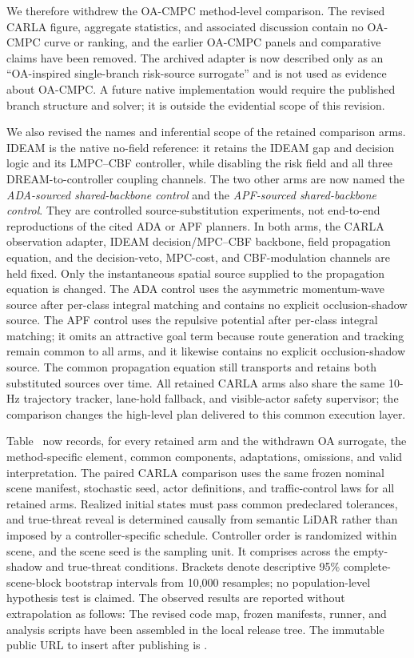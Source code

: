 We therefore withdrew the OA-CMPC method-level comparison.  The revised
CARLA figure, aggregate statistics, and associated discussion contain no
OA-CMPC curve or ranking, and the earlier OA-CMPC panels and comparative
claims have been removed.  The archived adapter is now described only as an
``OA-inspired single-branch risk-source surrogate'' and is not used as
evidence about OA-CMPC.  A future native implementation would require the
published branch structure and solver; it is outside the evidential scope of
this revision.

We also revised the names and inferential scope of the retained comparison
arms.  IDEAM is the native no-field reference: it retains the IDEAM gap and
decision logic and its LMPC--CBF controller, while disabling the risk field
and all three DREAM-to-controller coupling channels.  The two other arms are
now named the \emph{ADA-sourced shared-backbone control} and the
\emph{APF-sourced shared-backbone control}.  They are controlled
source-substitution experiments, not end-to-end reproductions of the cited
ADA or APF planners.  In both arms, the CARLA observation adapter, IDEAM
decision/MPC--CBF backbone, field propagation equation, and the decision-veto,
MPC-cost, and CBF-modulation channels are held fixed.  Only the instantaneous
spatial source supplied to the propagation equation is changed.  The ADA
control uses the asymmetric momentum-wave source after per-class integral
matching and contains no explicit occlusion-shadow source.  The APF control
uses the repulsive potential after per-class integral matching; it omits an
attractive goal term because route generation and tracking remain common to
all arms, and it likewise contains no explicit occlusion-shadow source.  The
common propagation equation still transports and retains both substituted
sources over time.  All retained CARLA arms also share the same 10-Hz
trajectory tracker, lane-hold fallback, and visible-actor safety supervisor;
the comparison changes the high-level plan delivered to this common execution
layer.

Table~\BaselineFidelityTableNumber{} now records, for every retained arm and
the withdrawn OA surrogate, the method-specific element, common components,
adaptations, omissions, and valid interpretation.  The paired CARLA comparison
uses the same frozen nominal
scene manifest, stochastic seed, actor definitions, and traffic-control laws
for all retained arms.  Realized initial states must pass common predeclared
tolerances, and true-threat reveal is determined causally from semantic LiDAR
rather than imposed by a controller-specific schedule.  Controller order is
randomized within scene, and the scene seed is the sampling unit.  It comprises
\CarlaSceneCount{} across the empty-shadow and true-threat conditions.
Brackets denote descriptive 95\% complete-scene-block bootstrap intervals from
10,000 resamples; no population-level hypothesis test is claimed.  The
observed results are reported without extrapolation as follows:
\CarlaEmptyShadowFinding{}
\CarlaThreatFinding{} The revised code map, frozen manifests, runner, and
analysis scripts have been assembled in the local release tree.  The
immutable public URL to insert after publishing is \BaselineCodeCommit{}.

